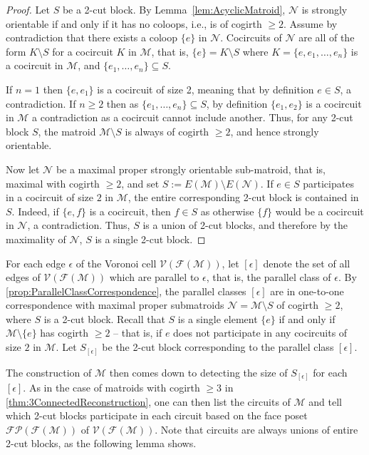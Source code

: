 \documentclass[12pt]{report}
\theoremstyle{definition}
\def\calF{\mathcal F}
\def\calM{\mathcal M}
\def\calN{\mathcal N}
\def\calP{\mathcal P}
\def\calV{\mathcal V}
\theoremstyle{upright}
\begin{document}
\begin{proof}

    Let $S$ be a 2-cut block. By Lemma~\ref{lem:AcyclicMatroid}, $\calN$ is strongly orientable if and only if it has no coloops, i.e., is of cogirth $\geq2$.
    Assume by contradiction that there exists a coloop $\{e\}$ in $\calN$.
    Cocircuits of $\calN$ are all of the form $K\setminus S$ for a cocircuit $K$ in $\calM$, that is, $\{e\}=K\setminus S$ where $K=\{e, e_1, \dots, e_n\}$ is a cocircuit in $\calM$, and $\{e_1, \dots, e_n\}\subseteq S$.

    If $n=1$ then $\{e, e_1\}$ is a cocircuit of size 2, meaning that by definition $e\in S$, a contradiction. 
    If $n\geq2$ then as $\{e_1, \dots, e_n\}\subseteq S$, by definition $\{e_1, e_2\}$ is a cocircuit in $\calM$ a contradiction as a cocircuit cannot include another.
    Thus, for any 2-cut block $S$, the matroid $\calM \setminus S$ is always of cogirth $\geq2$, and hence strongly orientable.

    Now let $\calN$ be a maximal proper strongly orientable sub-matroid, that is, maximal with cogirth $\geq2$, and set $S:=E(\calM)\setminus E(\calN)$.
    If $e\in S$ participates in a cocircuit of size $2$ in $\calM$, the entire corresponding 2-cut block is contained in $S$.
    Indeed, if $\{e, f\}$ is a cocircuit, then $f\in S$ as otherwise $\{f\}$ would be a cocircuit in $\calN$, a contradiction.
    Thus, $S$ is a union of 2-cut blocks, and therefore by the maximality of $\calN$, $S$ is a single 2-cut block.
    
\end{proof}

For each edge $\epsilon$ of the Voronoi cell $\calV(\calF(\calM))$, let $[\epsilon]$ denote the set of all edges of $\calV(\calF(\calM))$ which are parallel to $\epsilon$, that is, the parallel class of $\epsilon$.
By \cref{prop:ParallelClassCorrespondence}, the parallel classes $[\epsilon]$ are in one-to-one correspondence with maximal proper submatroids $\calN=\calM\setminus S$ of cogirth $\geq2$, where $S$ is a 2-cut block.
Recall that $S$ is a single element $\{e\}$ if and only if $\calM\setminus\{e\}$ has cogirth $\geq2$ -- that is, if $e$ does not participate in any cocircuits of size $2$ in $\calM$.
Let $S_{[\epsilon]}$ be the 2-cut block corresponding to the parallel class $[\epsilon]$.

The construction of $\calM$ then comes down to detecting the size of $S_{[\epsilon]}$ for each $[\epsilon]$.
As in the case of matroids with cogirth $\geq3$ in \cref{thm:3ConnectedReconstruction}, one can then list the circuits of $\calM$ and tell which 2-cut blocks participate in each circuit based on the face poset $\calF\calP(\calF(\calM))$ of $\calV(\calF(\calM))$.
Note that circuits are always unions of entire 2-cut blocks, as the following lemma shows.
\end{document}
